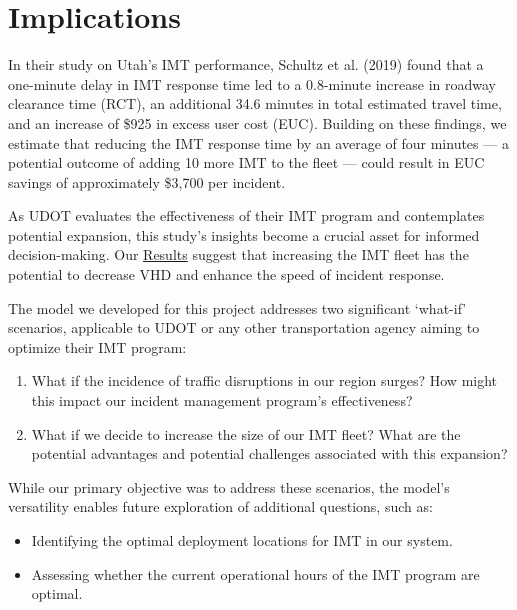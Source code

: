 \documentclass[fancy, oneside, mastersfancy, ms]{byuthesis}
\providecommand{\tightlist}{%
  \setlength{\itemsep}{0pt}\setlength{\parskip}{0pt}}\usepackage{longtable,booktabs,array}
\begin{document}
\hypertarget{sec-implications}{%
\section{Implications}\label{sec-implications}}

In their study on Utah's IMT performance, Schultz et al. (2019) found
that a one-minute delay in IMT response time led to a 0.8-minute
increase in roadway clearance time (RCT), an additional 34.6 minutes in
total estimated travel time, and an increase of \$925 in excess user
cost (EUC). Building on these findings, we estimate that reducing the
IMT response time by an average of four minutes --- a potential outcome
of adding 10 more IMT to the fleet --- could result in EUC savings of
approximately \$3,700 per incident.

As UDOT evaluates the effectiveness of their IMT program and
contemplates potential expansion, this study's insights become a crucial
asset for informed decision-making. Our
\protect\hyperlink{sec-results}{Results} suggest that increasing the IMT
fleet has the potential to decrease VHD and enhance the speed of
incident response.

The model we developed for this project addresses two significant
`what-if' scenarios, applicable to UDOT or any other transportation
agency aiming to optimize their IMT program:

\begin{enumerate}
\def\labelenumi{\arabic{enumi}.}
\tightlist
\item
  What if the incidence of traffic disruptions in our region surges? How
  might this impact our incident management program's effectiveness?
\item
  What if we decide to increase the size of our IMT fleet? What are the
  potential advantages and potential challenges associated with this
  expansion?
\end{enumerate}

While our primary objective was to address these scenarios, the model's
versatility enables future exploration of additional questions, such as:

\begin{itemize}
\tightlist
\item
  Identifying the optimal deployment locations for IMT in our system.
\item
  Assessing whether the current operational hours of the IMT program are
  optimal.
\end{itemize}
\end{document}
